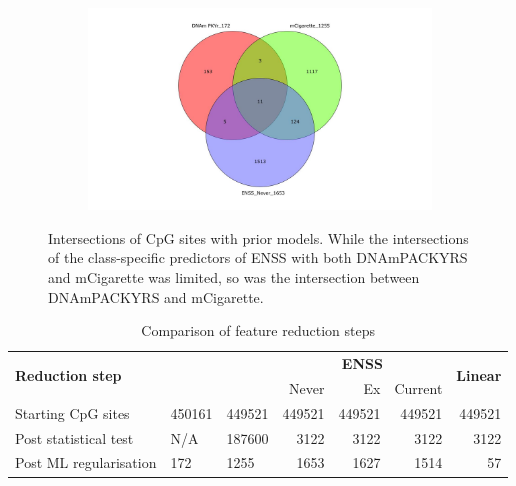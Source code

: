 \documentclass[draft]{article} %
\begin{document}
\begin{figure}[p]
    \begin{subfigure}{0.49\linewidth}
        \centering
        \includegraphics[width=\linewidth, trim=7cm 0cm 7cm 0cm, clip]{venn_diagrams/intersect_compare_never.jpg}
    \end{subfigure}
    \caption[Intersections of CpG sites with prior models]{Intersections of CpG sites with prior models. While the intersections of the class-specific predictors of ENSS with both DNAmPACKYRS and mCigarette was limited, so was the intersection between DNAmPACKYRS and mCigarette. }
    \label{fig:cpg-intersection-external}
\end{figure}

\begin{table}[p]
    \caption{Comparison of feature reduction steps} \label{table:sites-used}
    \begin{tabularx}{\textwidth}{l >{\raggedleft\arraybackslash}X >{\raggedleft\arraybackslash}X r r r r}
        \toprule
        \multirow{2}{*}{\textbf{Reduction step}} & \multirow{2}{*}{\textbf{DNAmPY}} & \multirow{2}{*}{\textbf{mCigarette}} & \multicolumn{3}{c}{\textbf{ENSS}} & \multirow{2}{*}{\textbf{Linear}}                               \\
        \cmidrule(lr){4-6}
                                                 &                                  &                                      & Never                             & Ex                               & Current      &              \\
        \midrule
        Starting CpG sites                       & \num{450161}                     & \num{449521}                         & \num{449521}                      & \num{449521}                     & \num{449521} & \num{449521} \\
        \addlinespace
        Post statistical test                    & N/A                              & \num{187600}                         & \num{3122}                        & \num{3122}                       & \num{3122}   & \num{3122}   \\
        \addlinespace
        Post ML regularisation                   & \num{172}                        & \num{1255}                           & \num{1653}                        & \num{1627}                       & \num{1514}   & \num{57}     \\
        \bottomrule
    \end{tabularx}
\end{table}
\end{document}
